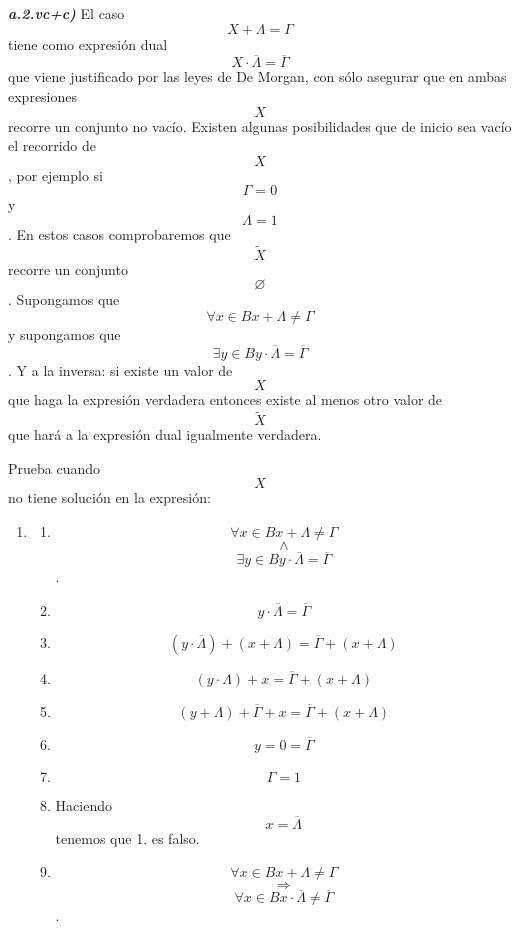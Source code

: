 \documentclass[
]{article}
\providecommand{\tightlist}{%
  \setlength{\itemsep}{0pt}\setlength{\parskip}{0pt}}
\begin{document}
\begin{enumerate}
\begin{enumerate}
\begin{enumerate}
\begin{enumerate}
\begin{enumerate}
          \emph{\textbf{a.2.vc+c)}} El caso \[{X + \Lambda} = \Gamma\]
          tiene como expresión dual
          \[{X \cdot \overline{\Lambda}} = \overline{\Gamma}\] que viene
          justificado por las leyes de De Morgan, con sólo asegurar que
          en am\-bas expresiones \[X\]recorre un conjunto no vacío.
          Existen algunas posibili\-dades que de inicio sea vacío el
          recorrido de \[X\], por ejemplo si \[\Gamma = 0\] y
          \[\Lambda = 1\]. En estos casos comprobaremos que
          \[\widetilde{X}\] recorre un conjunto \[\varnothing\].
          Supongamos que
          \[\forall{x \in B}{{x + \Lambda} \neq \Gamma}\]y supongamos
          que
          \[\exists{y \in B}{{y \cdot \overline{\Lambda}} = \overline{\Gamma}}\].
          Y a la inversa: si existe un valor de \[X\] que haga la
          ex\-presión verdadera entonces existe al menos otro valor de
          \[\widetilde{X}\] que hará a la expresión dual igualmente
          verdadera.

          Prueba cuando \[X\] no tiene solución en la expresión:

          \begin{enumerate}
          \def\labelenumvi{\arabic{enumvi}.}
          \tightlist
          \item
            \begin{enumerate}
            \def\labelenumvii{\arabic{enumvii}.}
            \tightlist
            \item
              \[\forall{x \in B}{{x + \Lambda} \neq \Gamma}\]\[\land\]\[\exists{y \in B}{{y \cdot \overline{\Lambda}} = \overline{\Gamma}}\].
            \item
              \[{y \cdot \overline{\Lambda}} = \overline{\Gamma}\]
            \item
              \[{\left( {y \cdot \overline{\Lambda}} \right) + \left( {x + \Lambda} \right)} = {\overline{\Gamma} + \left( {x + \Lambda} \right)}\]
            \item
              \[{\left( {y \cdot \Lambda} \right) + x} = {\overline{\Gamma} + \left( {x + \Lambda} \right)}\]
            \item
              \[{{\left( {y + \Lambda} \right) + \overline{\Gamma}} + x} = {\overline{\Gamma} + \left( {x + \Lambda} \right)}\]
            \item
              \[{y = 0} = \overline{\Gamma}\]
            \item
              \[\Gamma = 1\]
            \item
              Haciendo \[x = \overline{\Lambda}\] tenemos que 1. es
              falso.
            \item
              \[\forall{x \in B}{{x + \Lambda} \neq \Gamma}\]\[\Rightarrow\]\[\forall{x \in B}{{x \cdot \overline{\Lambda}} \neq \overline{\Gamma}}\].
            \end{enumerate}
          \end{enumerate}


\end{enumerate}
\end{enumerate}
\end{enumerate}
\end{enumerate}
\end{enumerate}
\end{document}
